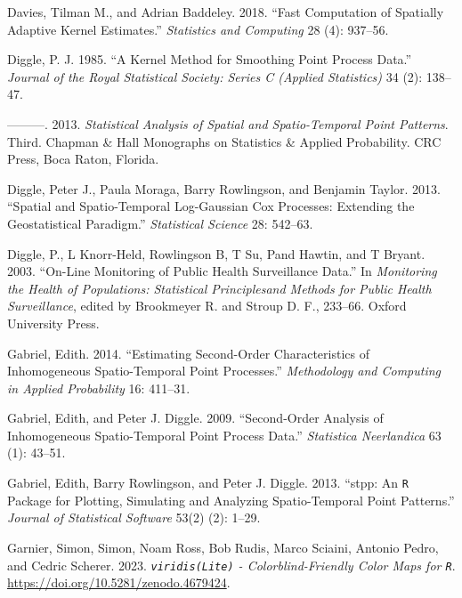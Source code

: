 \begin{CSLReferences}{1}{0}
\leavevmode{}%
Davies, Tilman M., and Adrian Baddeley. 2018. {``Fast Computation of Spatially Adaptive Kernel Estimates.''} \emph{Statistics and Computing} 28 (4): 937--56.

\leavevmode{}%
Diggle, P. J. 1985. {``A Kernel Method for Smoothing Point Process Data.''} \emph{Journal of the Royal Statistical Society: Series C (Applied Statistics)} 34 (2): 138--47.

\leavevmode{}%
---------. 2013. \emph{Statistical Analysis of Spatial and Spatio-Temporal Point Patterns}. Third. Chapman \& Hall Monographs on Statistics \& Applied Probability. CRC Press, Boca Raton, Florida.

\leavevmode{}%
Diggle, Peter J., Paula Moraga, Barry Rowlingson, and Benjamin Taylor. 2013. {``Spatial and Spatio-Temporal Log-{G}aussian {C}ox Processes: Extending the Geostatistical Paradigm.''} \emph{Statistical Science} 28: 542--63.

\leavevmode{}%
Diggle, P., L Knorr-Held, Rowlingson B, T Su, Pand Hawtin, and T Bryant. 2003. {``On-Line Monitoring of Public Health Surveillance Data.''} In \emph{Monitoring the Health of Populations: Statistical Principlesand Methods for Public Health Surveillance}, edited by Brookmeyer R. and Stroup D. F., 233--66. Oxford University Press.

\leavevmode{}%
Gabriel, Edith. 2014. {``Estimating Second-Order Characteristics of Inhomogeneous Spatio-Temporal Point Processes.''} \emph{Methodology and Computing in Applied Probability} 16: 411--31.

\leavevmode{}%
Gabriel, Edith, and Peter J. Diggle. 2009. {``Second-Order Analysis of Inhomogeneous Spatio-Temporal Point Process Data.''} \emph{Statistica Neerlandica} 63 (1): 43--51.

\leavevmode{}%
Gabriel, Edith, Barry Rowlingson, and Peter J. Diggle. 2013. {``{stpp}: An {\texttt{R}} Package for Plotting, Simulating and Analyzing Spatio-Temporal Point Patterns.''} \emph{Journal of Statistical Software} 53(2) (2): 1--29.

\leavevmode{}%
Garnier, Simon, Simon, Noam Ross, Bob Rudis, Marco Sciaini, Antonio Pedro, and Cedric Scherer. 2023. \emph{\texttt{viridis(Lite)} - Colorblind-Friendly Color Maps for \texttt{R}}. \url{https://doi.org/10.5281/zenodo.4679424}.


\end{CSLReferences}
